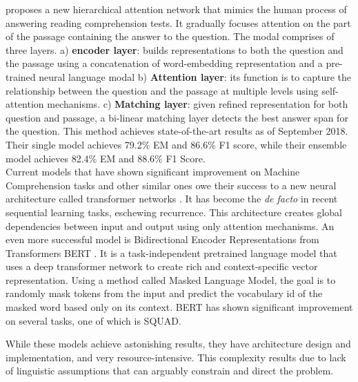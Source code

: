 \citep{DBLP:journals/corr/abs-1811-11934} proposes a new hierarchical attention network that mimics the human process of answering reading comprehension tests. It gradually focuses attention on the part of the passage containing the answer to the question. The modal comprises of three layers. a) \textbf{encoder layer}: builds representations to both the question and the passage using a concatenation of word-embedding representation \citep{pennington2014glove} and a pre-trained neural language modal \citep{Peters:2018} b) \textbf{Attention layer}: its function is to capture the relationship between the question and the passage at multiple levels using self-attention mechanisms. c) \textbf{Matching layer}: given refined representation for both question and passage, a bi-linear matching layer detects the best answer span for the question. This method achieves state-of-the-art results as of September 2018. Their single model achieves 79.2\% EM and 86.6\% F1 score, while their ensemble model achieves 82.4\% EM and 88.6\% F1 Score. \\

Current models that have shown significant improvement on Machine Comprehension tasks and other similar ones owe their success to a new neural architecture called transformer networks \citep{DBLP:journals/corr/VaswaniSPUJGKP17}. It has become the \emph{de facto} in recent sequential learning tasks, eschewing recurrence. This architecture creates global dependencies between input and output using only attention mechanisms. An even more successful model is Bidirectional Encoder Representations from Transformers BERT \citep{DBLP:journals/corr/abs-1810-04805}. It is a task-independent pretrained language model that uses a deep transformer network to create rich and context-specific vector representation. Using a method called Masked Language Model, the goal is to randomly mask tokens from the input and predict the vocabulary id of the masked word based only on its context. BERT has shown significant improvement on several tasks, one of which is SQUAD. 


While these models achieve astonishing results, they have architecture design and implementation, and very resource-intensive. This complexity results due to lack of linguistic assumptions that can arguably constrain and direct the problem. 



